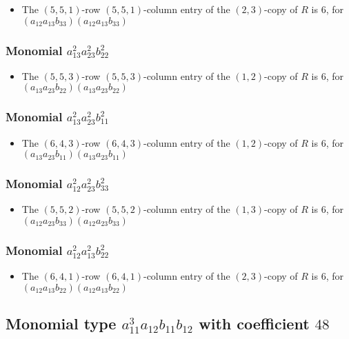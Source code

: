 \documentclass{article}
\begin{document}
\begin{itemize}
\item The $(5, 5, 1)$-row $(5, 5, 1)$-column entry of the $ \left(2, 3\right) $-copy of $R$ is $ 6 $, for $( a_{12} a_{13} b_{33} )( a_{12} a_{13} b_{33} )$ 
\end{itemize}
\subsubsection{Monomial $ a_{13}^{2} a_{23}^{2} b_{22}^{2} $}

\begin{itemize}
\item The $(5, 5, 3)$-row $(5, 5, 3)$-column entry of the $ \left(1, 2\right) $-copy of $R$ is $ 6 $, for $( a_{13} a_{23} b_{22} )( a_{13} a_{23} b_{22} )$ 
\end{itemize}
\subsubsection{Monomial $ a_{13}^{2} a_{23}^{2} b_{11}^{2} $}

\begin{itemize}
\item The $(6, 4, 3)$-row $(6, 4, 3)$-column entry of the $ \left(1, 2\right) $-copy of $R$ is $ 6 $, for $( a_{13} a_{23} b_{11} )( a_{13} a_{23} b_{11} )$ 
\end{itemize}
\subsubsection{Monomial $ a_{12}^{2} a_{23}^{2} b_{33}^{2} $}

\begin{itemize}
\item The $(5, 5, 2)$-row $(5, 5, 2)$-column entry of the $ \left(1, 3\right) $-copy of $R$ is $ 6 $, for $( a_{12} a_{23} b_{33} )( a_{12} a_{23} b_{33} )$ 
\end{itemize}
\subsubsection{Monomial $ a_{12}^{2} a_{13}^{2} b_{22}^{2} $}

\begin{itemize}
\item The $(6, 4, 1)$-row $(6, 4, 1)$-column entry of the $ \left(2, 3\right) $-copy of $R$ is $ 6 $, for $( a_{12} a_{13} b_{22} )( a_{12} a_{13} b_{22} )$ 
\end{itemize}
\subsection{Monomial type $ a_{11}^{3} a_{12} b_{11} b_{12} $ with coefficient $ 48 $}
\end{document}
